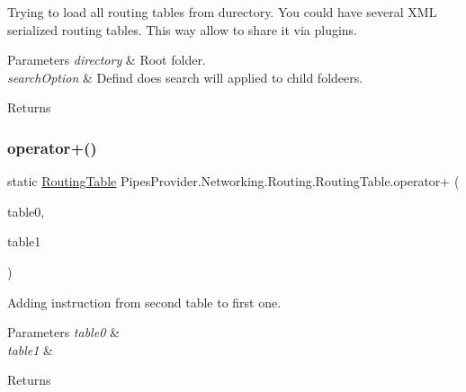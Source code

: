 Trying to load all routing tables from durectory. You could have several X\+ML serialized routing tables. This way allow to share it via plugins. 


\begin{DoxyParams}{Parameters}
{\em directory} & Root folder.\\
\hline
{\em search\+Option} & Defind does search will applied to child foldeers.\\
\hline
\end{DoxyParams}
\begin{DoxyReturn}{Returns}

\end{DoxyReturn}
\mbox{\label{class_pipes_provider_1_1_networking_1_1_routing_1_1_routing_table_a515b9ad19dc868afb6d47c762064fd96}} 
\subsubsection{\texorpdfstring{operator+()}{operator+()}}
{\footnotesize\ttfamily static \mbox{\hyperlink{class_pipes_provider_1_1_networking_1_1_routing_1_1_routing_table}{Routing\+Table}} Pipes\+Provider.\+Networking.\+Routing.\+Routing\+Table.\+operator+ (\begin{DoxyParamCaption}\item[{\mbox{\hyperlink{class_pipes_provider_1_1_networking_1_1_routing_1_1_routing_table}{Routing\+Table}}}]{table0,  }\item[{\mbox{\hyperlink{class_pipes_provider_1_1_networking_1_1_routing_1_1_routing_table}{Routing\+Table}}}]{table1 }\end{DoxyParamCaption})\hspace{0.3cm}{\ttfamily [static]}}



Adding instruction from second table to first one. 


\begin{DoxyParams}{Parameters}
{\em table0} & \\
\hline
{\em table1} & \\
\hline
\end{DoxyParams}
\begin{DoxyReturn}{Returns}

\end{DoxyReturn}
\mbox{\label{class_pipes_provider_1_1_networking_1_1_routing_1_1_routing_table_a1fe9c42819cd5c5210b254c0d868b336}} 
